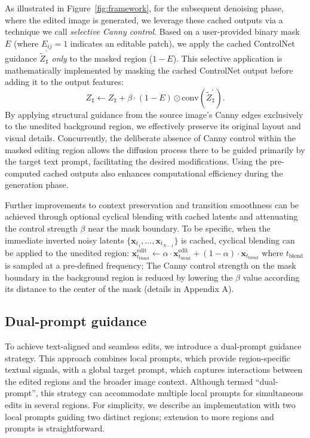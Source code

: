 \documentclass{article}
\begin{document}
As illustrated in Figure~\ref{fig:framework}, for the subsequent denoising phase, where the edited image is generated, we leverage these cached outputs via a technique we call \emph{selective Canny control}. Based on a user-provided binary mask $E$ (where $E_{ij}=1$ indicates an editable patch), we apply the cached ControlNet guidance $\tilde{Z}^{\prime}_{\texttt{I}}$ \emph{only} to the masked region ($1-E$). This selective application is mathematically implemented by masking the cached ControlNet output before adding it to the output features:
\begin{equation}
    Z_{\texttt{I}} \gets Z_{\texttt{I}} + \beta\cdot (1-E) \odot \mathrm{conv}(\tilde{Z}^{\prime}_{\texttt{I}}). \label{eq:tweak}
\end{equation}
By applying structural guidance from the source image's Canny edges exclusively to the unedited background region, we effectively preserve its original layout and visual details. Concurrently, the deliberate absence of Canny control within the masked editing region allows the diffusion process there to be guided primarily by the target text prompt, facilitating the desired modifications. Using the pre-computed cached outputs also enhances computational efficiency during the generation phase. 

Further improvements to context preservation and transition smoothness can be achieved through optional cyclical blending with cached latents and attenuating the control strength $\beta$ near the mask boundary. To be specific, when the immediate inverted noisy latents $\{\mathbf{x}_{t_{1}},...,\mathbf{x}_{t_{N-1}}\}$ is cached,  cyclical blending can be applied to the unedited region:  $\mathbf{x}^\text{edit}_{t_\text{blend}}\leftarrow \alpha\cdot\mathbf{x}^\text{edit}_{t_\text{blend}}+(1-\alpha)\cdot\mathbf{x}_{t_\text{blend}}$ where $t_\text{blend}$ is sampled at a pre-defined frequency; The Canny control strength on the mask boundary in the background region is reduced by lowering the $\beta$ value according its distance to the center of the mask (details in Appendix A).



\vspace{-1mm}
\subsection{Dual-prompt guidance}
\label{sec:dualprompt}
\vspace{-1mm}

To achieve text-aligned and seamless edits, we introduce a dual-prompt guidance strategy. This approach combines local prompts, which provide region-specific textual signals, with a global target prompt, which captures interactions between the edited regions and the broader image context. Although termed ``dual-prompt'', this strategy can accommodate multiple local prompts for simultaneous edits in several regions. For simplicity, we describe an implementation with two local prompts guiding two distinct regions; extension to more regions and prompts is straightforward.
\end{document}
